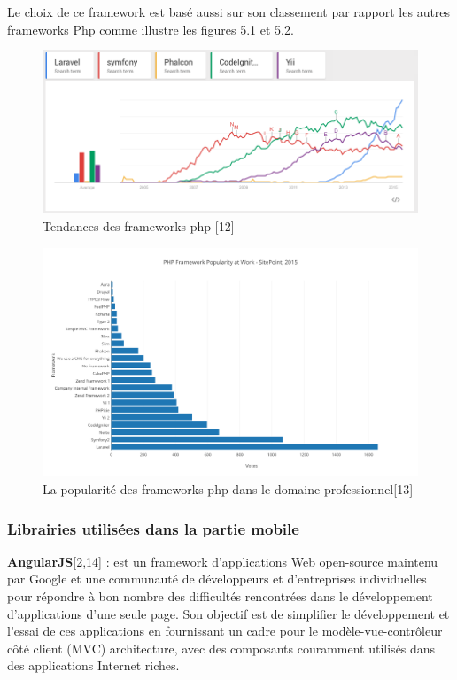 \documentclass[12pt, ChapStyle1, oneside]{./Styles/Dea_Gsm}
\begin{document}
Le choix de ce framework est basé aussi sur son classement par rapport les autres frameworks Php comme illustre les figures 5.1 et 5.2.


\begin{figure}[H]
    \centering
    \includegraphics[width=6in]{laravel/laraveltrends}
    \caption{Tendances des frameworks php [12]}
\end{figure}


\begin{figure}[H]
    \centering
    \includegraphics[width=5.5in]{laravel/php_framework_popularity_at_work}
    \caption{La popularité des frameworks php dans le domaine professionnel[13]}
\end{figure}

\subsubsection{Librairies utilisées dans la partie mobile}
\textbf{AngularJS}[2,14] :  est un framework d'applications Web open-source maintenu par Google et une communauté de développeurs et d'entreprises individuelles pour répondre à bon nombre des difficultés rencontrées dans le développement d'applications d'une seule page. Son objectif est de simplifier le développement et l'essai de ces applications en fournissant un cadre pour le modèle-vue-contrôleur côté client (MVC) architecture, avec des composants couramment utilisés dans des applications Internet riches.
\end{document}
